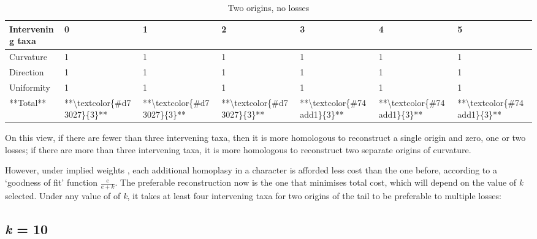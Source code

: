 \documentclass[]{book}
\theoremstyle{definition}
\theoremstyle{definition}
\theoremstyle{definition}
\theoremstyle{remark}
\begin{document}
\begin{table}

\caption{\label{tab:iw-delaet-ew-b}Two origins, no losses}
\centering
\begin{tabular}[t]{l|l|l|l|l|l|l}
\hline
Intervening taxa & 0 & 1 & 2 & 3 & 4 & 5\\
\hline
Curvature & 1 & 1 & 1 & 1 & 1 & 1\\
\hline
Direction & 1 & 1 & 1 & 1 & 1 & 1\\
\hline
Uniformity & 1 & 1 & 1 & 1 & 1 & 1\\
\hline
**Total** & **\textbackslash{}textcolor\{\#d73027\}\{3\}** & **\textbackslash{}textcolor\{\#d73027\}\{3\}** & **\textbackslash{}textcolor\{\#d73027\}\{3\}** & **\textbackslash{}textcolor\{\#74add1\}\{3\}** & **\textbackslash{}textcolor\{\#74add1\}\{3\}** & **\textbackslash{}textcolor\{\#74add1\}\{3\}**\\
\hline
\end{tabular}
\end{table}

On this view, if there are fewer than three intervening taxa, then it is
more homologous to reconstruct a single origin and zero, one or two
losses; if there are more than three intervening taxa, it is more
homologous to reconstruct two separate origins of curvature.

However, under implied weights \citep{Goloboff1993}, each additional
homoplasy in a character is afforded less cost than the one before,
according to a `goodness of fit' function \(\frac{e}{e + k}\). The
preferable reconstruction now is the one that minimises total cost,
which will depend on the value of \emph{k} selected. Under any value of
of \emph{k}, it takes at least four intervening taxa for two origins of
the tail to be preferable to multiple losses:

\subsection{\texorpdfstring{\emph{k} = 10}{k = 10}}\label{k-10}
\end{document}
